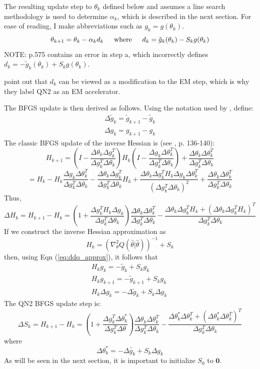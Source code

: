 \documentclass[letter,12pt]{article}
\begin{document}
The resulting update step to $\theta_k$ defined below and assumes a line search methodology is used to determine $\alpha_k$, which is described in the next section.  For ease of reading, I make abbreviations such as $g_k = g(\theta_k)$.
\[
\theta_{k+1} = \theta_k - \alpha_k d_k
\indent
\text{where}
\indent
d_k = \tilde{g}_k(\theta_k) - S_kg(\theta_k)
\]
NOTE: \cite{jamshidianj97} p.575 contains an error in step a, which incorrectly defines $d_k=-\tilde{g}_k(\theta_k) + S_kg(\theta_k)$.

\cite{jamshidianj97} point out that $d_k$ can be viewed as a modification to the EM step, which is why they label QN2 as an EM accelerator.

The BFGS update is then derived as follows.  Using the notation used by \cite{jamshidianj97}, define:
\[
\begin{array}{l}
\Delta \tilde{g}_k = \tilde{g}_{k+1} - \tilde{g}_{k} \\
\Delta g_k = g_{k+1} - g_k
\end{array}
\]
The classic BFGS update of the inverse Hessian is (see \cite{nocedalwright_BFGS}, p. 136-140):
\[
H_{k+1} = (I - \frac{\Delta \theta_k\Delta g_k^T}{\Delta g_k^T\Delta \theta_k})H_k(I-\frac{\Delta g_k\Delta \theta_k^T}{\Delta g_k^T\Delta \theta_k})+\frac{\Delta \theta_k\Delta \theta_k^T}{\Delta g_k^T\Delta \theta_k}
\]
\[
= H_k - H_k\frac{\Delta g_k\Delta \theta_k^T}{\Delta g_k^T\Delta \theta_k} - \frac{\Delta \theta_k\Delta g_k^T}{\Delta g_k^T\Delta \theta_k}H_k + \frac{\Delta \theta_k\Delta g_k^TH_k\Delta g_k\Delta \theta_k^T}{(\Delta g_k^T\Delta \theta_k)^2}+\frac{\Delta \theta_k\Delta \theta_k^T}{\Delta g_k^T\Delta \theta_k}
\]
Thus,
\[
\Delta H_k = H_{k+1} - H_k
= (1+\frac{\Delta g_k^TH_k\Delta g_k}{\Delta g_k^T\Delta \theta_k})\frac{\Delta \theta_k\Delta \theta_k^T}{\Delta g_k^T\Delta \theta_k} - \frac{\Delta \theta_k\Delta g_k^TH_k + (\Delta \theta_k\Delta g_k^TH_k)^T}{\Delta g_k^T\Delta \theta_k}
\]
If we construct the inverse Hessian approximation as
\[
H_k = (\nabla^2_{\theta}Q(\hat{\theta}|\hat{\theta}))^{-1} + S_k
\]
then, using Eqn (\ref{eq:ddq_approx}), it follows that
\[\begin{array}{c}
H_k  g_k =  -\tilde{g}_k + S_kg_k
\\
H_k  g_{k+1} = -\tilde{g}_{k+1} + S_kg_k
\\
H_k \Delta g_k = -\Delta \tilde{g}_k + S_k\Delta g_k
\end{array}\
\]
The QN2 BFGS update step is:
\begin{equation} \label{eq:BFGS}
\Delta S_k = H_{k+1} - H_k =
\left(
1 + \frac{\Delta g_k^T \Delta \theta_k^*}{\Delta g_k^T \Delta \theta}
\right)
\frac{\Delta \theta_k \Delta \theta_k^T}{\Delta g_k^T \Delta \theta_k}
-
\frac{\Delta \theta_k^* \Delta \theta_k^T + (\Delta \theta_k^* \Delta \theta_k^T)^T}{\Delta g_k^T \Delta \theta_k}
\end{equation}
where
\[
\Delta \theta_k^* = -\Delta \tilde{g_k} + S_k \Delta g_k
\]
As will be seen in the next section, it is important to initialize $S_0$ to $\boldsymbol{0}$.
\end{document}
